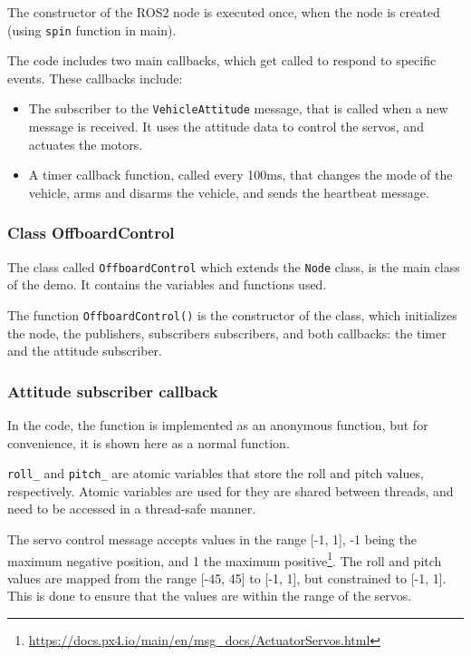 \documentclass[a4paper]{article}
\begin{document}
The constructor of the ROS2 node is executed once, when the node is created (using \verb|spin| function in main). 

The code includes two main callbacks, which get called to respond to specific events. These callbacks include: 
\begin{itemize}
    \item The subscriber to the \verb|VehicleAttitude| message, that is called when a new message is received. It uses the attitude data to control the servos, and actuates the motors. 
    \item A timer callback function, called every 100ms, that changes the mode of the vehicle, arms and disarms the vehicle, and sends the heartbeat message. 
\end{itemize}

\subsubsection{Class OffboardControl}

The class called \verb|OffboardControl| which extends the \verb|Node| class, is the main class of the demo. 
It contains the variables and functions used. 

The function \verb|OffboardControl()| is the constructor of the class, which initializes the node, the publishers, subscribers subscribers, and both callbacks: the timer and the attitude subscriber.



\subsubsection{Attitude subscriber callback}

In the code, the function is implemented as an anonymous function, but for convenience, it is shown here as a normal function.



\verb|roll_| and \verb|pitch_| are atomic variables that store the roll and pitch values, respectively. 
Atomic variables are used for they are shared between threads, and need to be accessed in a thread-safe manner. 

The servo control message accepts values in the range [-1, 1], -1 being the maximum negative position, and 1 the maximum positive\footnote{\url{https://docs.px4.io/main/en/msg_docs/ActuatorServos.html}}. 
The roll and pitch values are mapped from the range [-45, 45] to [-1, 1], but constrained to [-1, 1]. 
This is done to ensure that the values are within the range of the servos. \\
\end{document}
